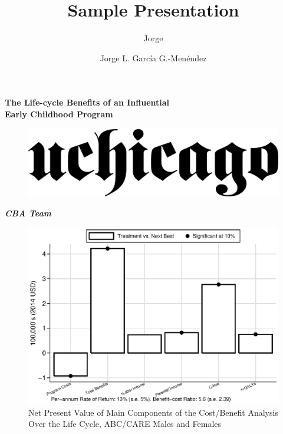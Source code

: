 

\title{Sample Presentation}
\subtitle{Jorge}
\author{Jorge L. Garc\'{i}a G.-Men\'{e}ndez}



\begin{frame}[plain]
\begin{center}
	\textbf{The Life-cycle Benefits of an Influential \\
	Early Childhood Program}

\begin{center}
\begin{figure}[H] 
\label{figure:initial}
\centering
\includegraphics[width=.5\columnwidth]{uchicago2.png}
\end{figure}
\end{center}
	\textbf \textit{{\footnotesize CBA Team}}	
\end{center}
\end{frame}


\begin{frame}[plain]
	\begin{center}
\begin{figure}[H] 
\caption{Net Present Value of Main Components of the Cost/Benefit Analysis Over the Life Cycle, ABC/CARE Males and Females}
\label{figure:youlabel}
\centering
\includegraphics[width=.9\columnwidth]{output/abccare_npvssumm.eps}
\end{figure}
\end{center}
\end{frame}

